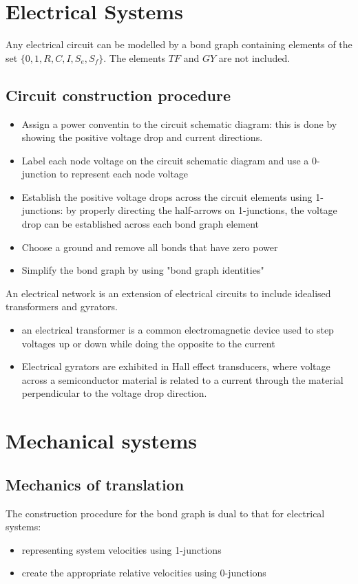 \documentclass{book}
\begin{document}
\section{Electrical Systems}
Any electrical circuit can be modelled by a bond graph containing elements of the set $\{0,1,R,C,I,S_e,S_f\}$. The elements $TF$ and $GY$ are not included. 
\subsection{Circuit construction procedure}
\begin{itemize}
    \item Assign a power conventin to the circuit schematic diagram: this is done by showing the positive voltage drop and current directions.
    \item Label each node voltage on the circuit schematic diagram and use a 0-junction to represent each node voltage 
    \item Establish the positive voltage drops across the circuit elements using 1-junctions: by properly directing the half-arrows on 1-junctions, the voltage drop can be established across each bond graph element
    \item Choose a ground and remove all bonds that have zero power
    \item Simplify the bond graph by using "bond graph identities"
\end{itemize}
An electrical network is an extension of electrical circuits to include idealised transformers and gyrators.
\begin{itemize}
    \item an electrical transformer is a common electromagnetic device used to step voltages up or down while doing the opposite to the current 
    \item Electrical gyrators are exhibited in Hall effect transducers, where voltage across a semiconductor material is related to a current through the material perpendicular to the voltage drop direction.
\end{itemize}

\section{Mechanical systems}
\subsection{Mechanics of translation}
The construction procedure for the bond graph is dual to that for electrical systems: 
\begin{itemize}
    \item representing system velocities using 1-junctions
    \item create the appropriate relative velocities using 0-junctions
\end{itemize}
\end{document}
